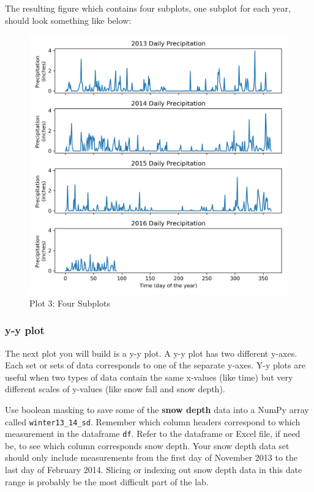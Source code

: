 \documentclass[11pt]{article}
\makeatletter
\def\maxwidth{\ifdim\Gin@nat@width>\linewidth\linewidth
    \else\Gin@nat@width\fi}
\let\Oldincludegraphics\includegraphics
\renewcommand{\includegraphics}[1]{\Oldincludegraphics[width=.8\maxwidth]{#1}}
\makeatother
\begin{document}
The resulting figure which contains four subplots, one subplot for each
year, should look something like below:

\begin{figure}
\centering
\includegraphics{images/plot3.png}
\caption{Plot 3: Four Subplots}
\end{figure}

\newpage

    \hypertarget{y-y-plot}{%
\subsubsection{y-y plot}\label{y-y-plot}}

The next plot you will build is a y-y plot. A y-y plot has two different
y-axes. Each set or sets of data corresponds to one of the separate
y-axes. Y-y plots are useful when two types of data contain the same
x-values (like time) but very different scales of y-values (like snow
fall and snow depth).

Use boolean masking to save some of the \textbf{snow depth} data into a
NumPy array called \texttt{winter13\_14\_sd}. Remember which column
headers correspond to which measurement in the dataframe \texttt{df}.
Refer to the dataframe or Excel file, if need be, to see which column
corresponds snow depth. Your snow depth data set should only include
measurements from the first day of November 2013 to the last day of
February 2014. Slicing or indexing out snow depth data in this date
range is probably be the most difficult part of the lab.
\end{document}
